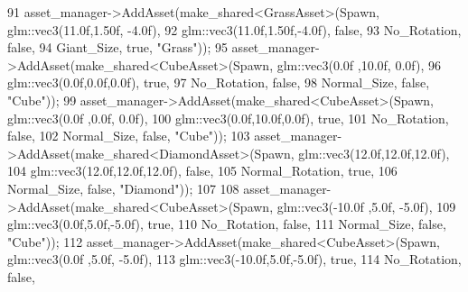 \begin{DoxyCode}
91         asset\_manager->AddAsset(make\_shared<GrassAsset>(Spawn, glm::vec3(11.0f,1.50f, -4.0f), 
92                                                         glm::vec3(11.0f,1.50f,-4.0f), \textcolor{keyword}{false},
93                                                         No\_Rotation, \textcolor{keyword}{false},
94                                                         Giant\_Size, \textcolor{keyword}{true}, \textcolor{stringliteral}{"Grass"}));
95         asset\_manager->AddAsset(make\_shared<CubeAsset>(Spawn, glm::vec3(0.0f ,10.0f, 0.0f),
96                                                          glm::vec3(0.0f,0.0f,0.0f), \textcolor{keyword}{true},
97                                                          No\_Rotation, \textcolor{keyword}{false},
98                                                          Normal\_Size, \textcolor{keyword}{false}, \textcolor{stringliteral}{"Cube"}));
99         asset\_manager->AddAsset(make\_shared<CubeAsset>(Spawn, glm::vec3(0.0f ,0.0f, 0.0f),
100                                                        glm::vec3(0.0f,10.0f,0.0f), \textcolor{keyword}{true},
101                                                          No\_Rotation, \textcolor{keyword}{false}, 
102                                                          Normal\_Size, \textcolor{keyword}{false}, \textcolor{stringliteral}{"Cube"}));
103         asset\_manager->AddAsset(make\_shared<DiamondAsset>(Spawn, glm::vec3(12.0f,12.0f,12.0f), 
104                                                           glm::vec3(12.0f,12.0f,12.0f), \textcolor{keyword}{false},
105                                                           Normal\_Rotation, \textcolor{keyword}{true},
106                                                           Normal\_Size, \textcolor{keyword}{false}, \textcolor{stringliteral}{"Diamond"})); 
107                                                           
108         asset\_manager->AddAsset(make\_shared<CubeAsset>(Spawn, glm::vec3(-10.0f ,5.0f, -5.0f),
109                                                          glm::vec3(0.0f,5.0f,-5.0f), \textcolor{keyword}{true},
110                                                          No\_Rotation, \textcolor{keyword}{false},
111                                                          Normal\_Size, \textcolor{keyword}{false}, \textcolor{stringliteral}{"Cube"}));
112         asset\_manager->AddAsset(make\_shared<CubeAsset>(Spawn, glm::vec3(0.0f ,5.0f, -5.0f),
113                                                        glm::vec3(-10.0f,5.0f,-5.0f), \textcolor{keyword}{true},
114                                                          No\_Rotation, \textcolor{keyword}{false}, 

\end{DoxyCode}
